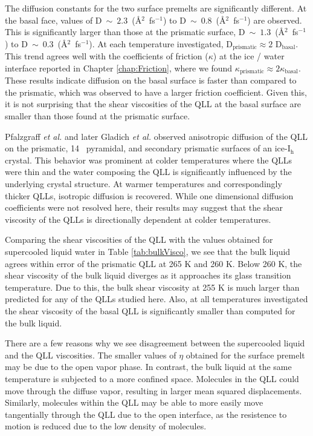 The diffusion constants for the two surface premelts are significantly
different. At the basal face, values of
$\mathrm{D}~\sim~2.3$~(\AA$^{2}$~fs$^{-1}$) to
$\mathrm{D}~\sim~0.8$~(\AA$^{2}$~fs$^{-1}$) are observed. This is
significantly larger than those at the prismatic surface,
$\mathrm{D}~\sim~1.3$~(\AA$^{2}$~fs$^{-1}$) to
$\mathrm{D}~\sim~0.3$~(\AA$^{2}$~fs$^{-1}$). At each temperature
investigated, D$_\mathrm{prismatic} \approx 2$
D$_\mathrm{basal}$. This trend agrees well with the coefficients of
friction ($\kappa$) at the ice / water interface reported in Chapter
\ref{chap:Friction}, where we found
$\kappa_\mathrm{prismatic} \approx 2 \kappa_\mathrm{basal}$. These
results indicate diffusion on the basal surface is faster than
compared to the prismatic, which was observed to have a larger
friction coefficient. Given this, it is not surprising that the shear
viscosities of the QLL at the basal surface are smaller than those
found at the prismatic surface.

Pfalzgraff \textit{et al.}\cite{Pfalzgraff2011} and later Gladich
\textit{et al.}\cite{Gladich2011,Gladich2015} observed anisotropic
diffusion of the QLL on the prismatic, 14\degree~ pyramidal, and
secondary prismatic surfaces of an ice-I$_\mathrm{h}$ crystal. This
behavior was prominent at colder temperatures where the QLLs were thin
and the water composing the QLL is significantly influenced by the
underlying crystal structure. At warmer temperatures and
correspondingly thicker QLLs, isotropic diffusion is recovered. While
one dimensional diffusion coefficients were not resolved here, their
results may suggest that the shear viscosity of the QLLs is
directionally dependent at colder temperatures. 

Comparing the shear viscosities of the QLL with the values obtained
for supercooled liquid water in Table \ref{tab:bulkVisco}, we see that
the bulk liquid agrees within error of the prismatic QLL at 265 K and
260 K. Below 260 K, the shear viscosity of the bulk liquid diverges as
it approaches its glass transition temperature. Due to this, the bulk
shear viscosity at 255 K is much larger than predicted for any of the
QLLs studied here. Also, at all temperatures investigated the shear
viscosity of the basal QLL is significantly smaller than computed for
the bulk liquid. 

There are a few reasons why we see disagreement between the
supercooled liquid and the QLL viscosities. The smaller values of
$\eta$ obtained for the surface premelt may be due to the open vapor
phase. In contrast, the bulk liquid at the same temperature is
subjected to a more confined space. Molecules in the QLL could move
through the diffuse vapor, resulting in larger mean squared
displacements. Similarly, molecules within the QLL may be able to more
easily move tangentially through the QLL due to the open interface, as
the resistence to motion is reduced due to the low density of
molecules.

